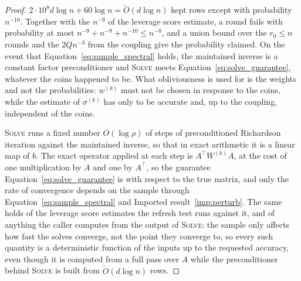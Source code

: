 \documentclass[11pt]{article}
\renewcommand{\O}{\widetilde O}
\begin{document}
\begin{proof}
$2 \cdot 10^{8} d \log n + 60 \log n = \O(d \log n)$ kept rows except with
probability $n^{-10}$.
Together with the $n^{-9}$ of the leverage score estimate, a round fails with
probability at most $n^{-9} + n^{-9} + n^{-10} \le n^{-8}$, and a union bound
over the $r_0 \le n$ rounds and the
$2 Q n^{-3}$ from the coupling give the probability claimed.
On the event that Equation~\eqref{eq:sample_spectral} holds, the maintained
inverse is a constant factor preconditioner and \textsc{Solve} meets
Equation~\eqref{eq:solve_guarantee}, whatever the coins happened to be.
What obliviousness is used for is the weights and not the probabilities:
$w^{(k)}$ must not be chosen in response to the coins, while the estimate of
$\sigma^{(k)}$ has only to be accurate and, up to the coupling, independent of
the coins.

\textsc{Solve} runs a fixed number $O(\log \rho)$ of steps of preconditioned
Richardson iteration against the maintained inverse, so that in exact arithmetic
it is a linear map of $b$.
The exact operator applied at each step is $A^\top W^{(k)} A$, at the cost of
one multiplication by $A$ and one by
$A^\top$, so the guarantee Equation~\eqref{eq:solve_guarantee} is with respect
to the true matrix, and only the rate of convergence depends on the sample
through Equation~\eqref{eq:sample_spectral} and Imported
result~\ref{imp:perturb}.
The same holds of the leverage score estimates the refresh test runs against it,
and of anything the caller computes from the output of \textsc{Solve}: the
sample only affects how fast the solves converge, not the point they converge
to, so every such quantity is a deterministic function of the inputs up to the
requested accuracy, even though it is computed from a full pass over $A$ while
the preconditioner behind \textsc{Solve} is built from $\O(d \log n)$ rows.


\end{proof}
\end{document}
